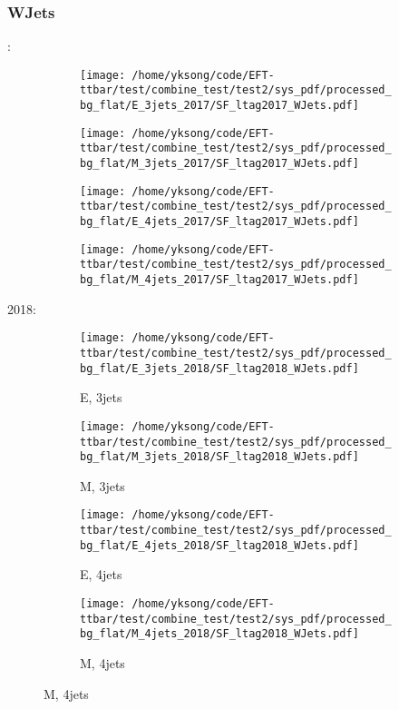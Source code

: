 \documentclass{beamer}
\begin{document}
\begin{frame}
\frametitle{WJets}
\fontsize{5}{1}:
\begin{figure}
\centering
\begin{subfigure}[b]{0.24\textwidth}
\texttt{[image: /home/yksong/code/EFT-ttbar/test/combine\_test/test2/sys\_pdf/processed\_bg\_flat/E\_3jets\_2017/SF\_ltag2017\_WJets.pdf]}
\end{subfigure}
\begin{subfigure}[b]{0.24\textwidth}
\texttt{[image: /home/yksong/code/EFT-ttbar/test/combine\_test/test2/sys\_pdf/processed\_bg\_flat/M\_3jets\_2017/SF\_ltag2017\_WJets.pdf]}
\end{subfigure}
\begin{subfigure}[b]{0.24\textwidth}
\texttt{[image: /home/yksong/code/EFT-ttbar/test/combine\_test/test2/sys\_pdf/processed\_bg\_flat/E\_4jets\_2017/SF\_ltag2017\_WJets.pdf]}
\end{subfigure}
\begin{subfigure}[b]{0.24\textwidth}
\texttt{[image: /home/yksong/code/EFT-ttbar/test/combine\_test/test2/sys\_pdf/processed\_bg\_flat/M\_4jets\_2017/SF\_ltag2017\_WJets.pdf]}
\end{subfigure}
\end{figure}
2018:
\begin{figure}
\centering
\begin{subfigure}[b]{0.24\textwidth}
\texttt{[image: /home/yksong/code/EFT-ttbar/test/combine\_test/test2/sys\_pdf/processed\_bg\_flat/E\_3jets\_2018/SF\_ltag2018\_WJets.pdf]}
\captionsetup{font=tiny}
\caption{E, 3jets}
\end{subfigure}
\begin{subfigure}[b]{0.24\textwidth}
\texttt{[image: /home/yksong/code/EFT-ttbar/test/combine\_test/test2/sys\_pdf/processed\_bg\_flat/M\_3jets\_2018/SF\_ltag2018\_WJets.pdf]}
\captionsetup{font=tiny}
\caption{M, 3jets}
\end{subfigure}
\begin{subfigure}[b]{0.24\textwidth}
\texttt{[image: /home/yksong/code/EFT-ttbar/test/combine\_test/test2/sys\_pdf/processed\_bg\_flat/E\_4jets\_2018/SF\_ltag2018\_WJets.pdf]}
\captionsetup{font=tiny}
\caption{E, 4jets}
\end{subfigure}
\begin{subfigure}[b]{0.24\textwidth}
\texttt{[image: /home/yksong/code/EFT-ttbar/test/combine\_test/test2/sys\_pdf/processed\_bg\_flat/M\_4jets\_2018/SF\_ltag2018\_WJets.pdf]}
\captionsetup{font=tiny}
\caption{M, 4jets}
\end{subfigure}
\end{figure}
\end{frame}
\end{document}
